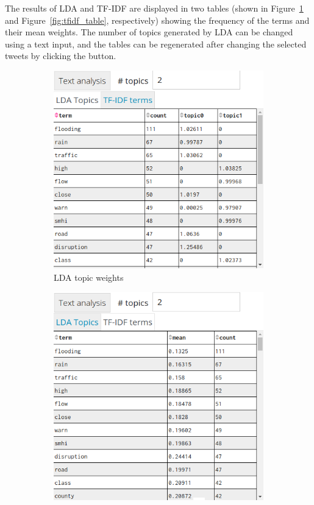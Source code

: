 The results of \ac{LDA} and \ac{TF-IDF} are displayed in two tables
(shown in Figure~\ref{fig:lda_table} and Figure~\ref{fig:tfidf_table}, respectively)  showing the
frequency of the terms and their mean weights. The number of topics generated by \ac{LDA} can be
changed using a text input, and the tables can be regenerated after changing the selected tweets by
clicking the button. 

\begin{figure}
    \centering
    \begin{subfigure}[b]{0.48\textwidth}
        \centering
        \includegraphics[width=\textwidth]{./images/lda_topics.png}
        \caption{\ac{LDA} topic weights}
        \label{fig:lda_table}
    \end{subfigure}
    \hfill
    \begin{subfigure}[b]{0.48\textwidth}
        \centering
        \includegraphics[width=\textwidth, trim={0 0.5cm 0 0},clip]{./images/tf_idf.png}

\end{subfigure}
\end{figure}
